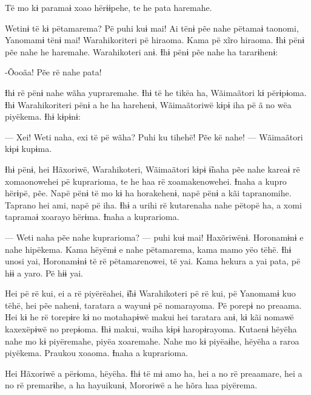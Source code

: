 Të mo kɨ paramaɨ xoao hërɨɨpehe, te he pata haremahe. 

Wetinɨ të kɨ pëtamarema? Pë puhi kuɨ mai! Ai tënɨ pẽe nahe pëtamaɨ
taonomi, Yanomamɨ tënɨ mai! Warahikoriteri pë hiraoma. Kama pë xĩro
hiraoma. Ɨhɨ pënɨ pẽe nahe he haremahe. Warahikoteri anɨ. Ɨhɨ pënɨ pẽe
nahe ha tararɨhenɨ: 

-Õooãa! Pẽe rë nahe pata! 

Ɨhɨ rë pënɨ nahe wãha yupraremahe. Ɨhɨ të he tikëa ha, Wãimaãtori kɨ
përɨpɨoma. Ɨhɨ Warahikoriteri pënɨ a he ha harehenɨ, Wãimaãtoriwë kɨpɨ
iha pë ã no wëa piyëkema. Ɨhɨ kɨpɨnɨ:

— Xei! Weti naha, exi të pë wãha? Puhi ku tihehë! Pẽe kë nahe! ---
Wãimaãtori kɨpɨ kupɨma. 

 

\begin{center} \end{center}


Ɨhɨ pënɨ, hei Hãxoriwë, Warahikoteri, Wãimaãtori kɨpɨ ɨ̃naha pẽe nahe
kareaɨ rë xomaonowehei pë kuprarioma, te he haa rë xoamakenowehei. Ɨnaha
a kupro hërɨpë, pẽe. Napë pënɨ të mo kɨ ha horakehenɨ, napë pënɨ a kãi
tapranomihe. Taprano hei ami, napë pë iha. Ɨhɨ a urihi rë kutarenaha
nahe pëtopë ha, a xomi tapramaɨ xoarayo hërɨma. Ɨnaha a kuprarioma. 

— Weti naha pẽe nahe kuprarioma? --- puhi kuɨ mai! Haxõriwënɨ. Horonamɨnɨ
e nahe hipëkema. Kama hëyëmɨ e nahe pëtamarema, kama mamo yëo tëhë. Ɨhɨ
unosi yai, Horonamɨnɨ të rë pëtamarenowei, të yai. Kama hekura a yai
pata, pë hɨɨ a yaro. Pë hɨɨ yai. 

Hei pë rë kui, ei a rë piyërëahei, ɨ̃hɨ Warahikoteri pë rë kui, pë
Yanomamɨ kuo tëhë, hei pẽe nahenɨ, taratara a wayunɨ pë nomarayoma. Pë
porepɨ no preaama. Hei kɨ he rë torepɨre kɨ no motahapɨwë makui hei
taratara anɨ, kɨ kãi nomawë kaxexëpɨwë no prepɨoma. Ɨhɨ makui, waiha
kɨpɨ haropɨrayoma. Kutaenɨ hëyëha nahe mo kɨ piyëremahe, piyëa
xoaremahe. Nahe mo kɨ piyëaɨhe, hëyëha a raroa piyëkema. Praukou xoaoma.
Ɨnaha a kuprarioma. 

Hei Hãxoriwë a përɨoma, hëyëha. Ɨhɨ të mɨ amo ha, hei a no rë preaamare,
hei a no rë premarɨhe, a ha hayuikunɨ, Mororiwë a he hõra haa piyërema.

 

 
